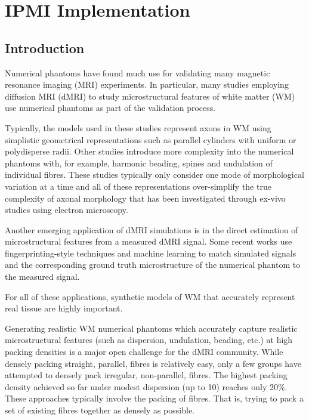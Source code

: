 \chapter{IPMI Implementation}
\label{sec:ipmi-implementation}

\section{Introduction}
\label{sec:Introduction}
Numerical phantoms have found much use for validating many magnetic resonance imaging (MRI) experiments.
In particular, many studies employing diffusion MRI (dMRI) to study microstructural features of white matter (WM) use numerical phantoms as part of the validation process\cite{Zhang2012,Nilsson2010,Nilsson2017}.

Typically, the models used in these studies represent axons in WM using simplistic geometrical representations such as parallel cylinders with uniform\cite{Nilsson2010} or polydisperse\cite{Hall2009} radii. Other studies introduce more complexity into the numerical phantoms with, for example, harmonic beading\cite{Budde2010}, spines \cite{Palombo2018} and undulation of individual fibres\cite{Nilsson2012}. These studies typically only consider one mode of morphological variation at a time and all of these representations over-simplify the true complexity of axonal morphology that has been investigated through ex-vivo studies using electron microscopy\cite{Lee2018a}.

Another emerging application of dMRI simulations is in the direct estimation of microstructural features from a measured dMRI signal. Some recent works use fingerprinting-style techniques and machine learning to match simulated signals and the corresponding ground truth microstructure of the numerical phantom to the measured signal\cite{Rensonnet2018,Hill2018,Palombo2018a,Nedjati-Gilani2017}.

For all of these applications, synthetic models of WM that accurately represent real tissue are highly important.

Generating realistic WM numerical phantoms which accurately capture realistic microstructural features (such as dispersion, undulation, beading, etc.) at high packing densities is a major open challenge for the dMRI community.
While densely packing straight, parallel, fibres is relatively easy, only a few groups have attempted to densely pack irregular, non-parallel, fibres.
The highest packing density achieved so far under modest dispersion (up to 10\degree) reaches only 20\%\cite{Ginsburger2018}.
These approaches typically involve the packing of fibres. That is, trying to pack a set of existing fibres together as densely as possible.


